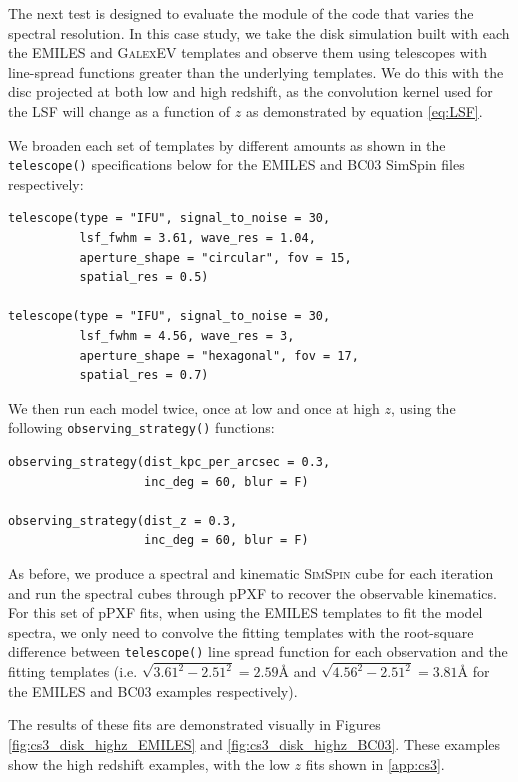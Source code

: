 \documentclass[
  journal=pasa,
  manuscript=research-paper, %
  year=2020,
  volume=37,
]{cup-journal}
\newcommand{\simspin}[1]{\textsc{SimSpin}#1} %
\newcommand{\telescope}[1]{\texttt{telescope()}#1}
\newcommand{\observingstrategy}[1]{\texttt{observing\_strategy()}#1}
\begin{document}
The next test is designed to evaluate the module of the code that varies the spectral resolution. 
In this case study, we take the disk simulation built with each the EMILES and \textsc{GalexEV} templates and observe them using telescopes with line-spread functions greater than the underlying templates. 
We do this with the disc projected at both low and high redshift, as the convolution kernel used for the LSF will change as a function of $z$ as demonstrated by equation \ref{eq:LSF}.

We broaden each set of templates by different amounts as shown in the \telescope{} specifications below for the EMILES and BC03 SimSpin files respectively:
\begin{lstlisting}[basicstyle=\fontsize{6}{8}\selectfont\ttfamily]
telescope(type = "IFU", signal_to_noise = 30, 
          lsf_fwhm = 3.61, wave_res = 1.04,
          aperture_shape = "circular", fov = 15,
          spatial_res = 0.5)

telescope(type = "IFU", signal_to_noise = 30, 
          lsf_fwhm = 4.56, wave_res = 3, 
          aperture_shape = "hexagonal", fov = 17,
          spatial_res = 0.7)
\end{lstlisting}

\noindent We then run each model twice, once at low and once at high $z$, using the following \observingstrategy{} functions:
\begin{lstlisting}[basicstyle=\fontsize{6}{8}\selectfont\ttfamily]
observing_strategy(dist_kpc_per_arcsec = 0.3, 
                   inc_deg = 60, blur = F)

observing_strategy(dist_z = 0.3, 
                   inc_deg = 60, blur = F)
\end{lstlisting}

As before, we produce a spectral and kinematic \simspin{} cube for each iteration and run the spectral cubes through pPXF to recover the observable kinematics. 
For this set of pPXF fits, when using the EMILES templates to fit the model spectra, we only need to convolve the fitting templates with the root-square difference between \telescope{} line spread function for each observation and the fitting templates (i.e. $\sqrt{3.61^{2} - 2.51^{2}} = 2.59$\AA{} and $\sqrt{4.56^{2} - 2.51^{2}} = 3.81$\AA{} for the EMILES and BC03 examples respectively).

The results of these fits are demonstrated visually in Figures \ref{fig:cs3_disk_highz_EMILES} and \ref{fig:cs3_disk_highz_BC03}. 
These examples show the high redshift examples, with the low $z$ fits shown in \ref{app:cs3}.
\end{document}
